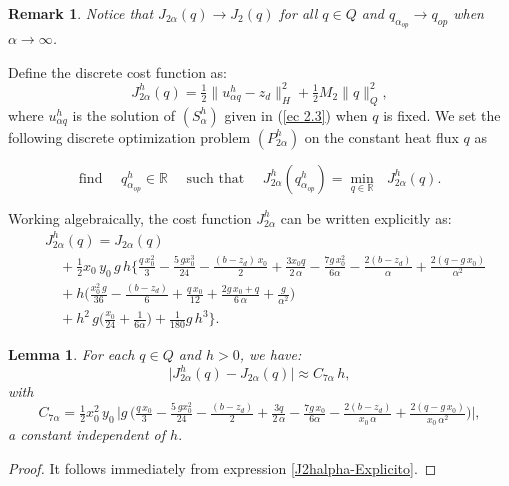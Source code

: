 \documentclass[11pt]{article}
\newtheorem{Lemma}{Lemma}
\newtheorem{Remark}{Remark}
\begin{document}
 \begin{Remark} Notice that $J_{2\alpha}(q)\to J_2(q) $ for all $q\in Q$ and $q_{\alpha_{op}}\to q_{op}$ when $\alpha \to \infty$. 
\end{Remark}   
   
     
  
    
       \noindent Define the discrete cost function as:
\begin{equation}    
   {  J^h_{2 \alpha}} (q)=  \tfrac{1}{2} \lVert {u^h_{\alpha q}} - z_d \rVert^2_H +  \tfrac{1}{2} M_2 \lVert q \rVert ^2_Q ,
     \end{equation}
where {$u^h_{\alpha q}$} is the solution of ${(S^h_{\alpha})}$ given in (\ref{ec 2.3}) {when $q$ is fixed}. We set the following discrete optimization problem 
 ${(P^h_{2\alpha})}$ on the constant heat flux $q$ as

$$ \text{find }\quad { q^h_{\alpha_{op}}}\in \mathbb{R}\quad\text{ such that }\quad
{ J^h_{2 \alpha}}({ q^h_{\alpha_{op}}})=\min\limits_{q\in \mathbb{R}} \text{ }{ J^h_{2 \alpha}}({q}).
$$
  
    
    
  
  
  Working algebraically, the cost function ${ J^h_{2 \alpha}}$ can be written explicitly as:
  \begin{equation}\label{J2halpha-Explicito}
  \begin{array}{rl}
&  { J^h_{2 \alpha}}(q)= J_{2\alpha}(q) \\[0.45cm]
  &\quad+ \tfrac{1}{2} x_0\,y_0 \,g \,h \Big \{   \tfrac{ q\,x_0^2}{3}   - \tfrac{5\,g x_0^3}{24}  - \tfrac{(b-z_d)\,x_0}{2} 
    + \tfrac{3 x_0 q}{2\,\alpha} - \tfrac{7 g\,x_0^2}{6\alpha}
     - \tfrac{2(b-z_d)}{\alpha}+ \tfrac{2(q-g\,x_0)}{\alpha^2} \\[0.45cm]
    & \quad + h \Big( \tfrac{x_0^2\, g}{36}-  \tfrac{(b-z_d)}{6} + \tfrac{q \,x_0}{12} + \tfrac{2g\,x_0+q}{6\,\alpha}+\tfrac{g}{\alpha^2}\Big)\\[0.45cm]
    & \quad + h^2\,g \Big( \tfrac{x_0}{24} + \tfrac{1}{6\alpha} \Big) + \tfrac{1}{180} g\, h^3 \Big\}. 
    \end{array}
    \end{equation}
     

  
\begin{Lemma}\label{Lema 4.4} For each $q\in Q$  and $h>0$, we have:
\begin{equation}   \lvert  { J^h_{2 \alpha}}(q) - J_{2\alpha}(q) \rvert  \approx C_{7 \alpha} \, h, 
   \end{equation}
      with $$C_{7 \alpha} = \tfrac{1}{2}x_0^2\, y_0\, \Big \lvert g \,  \Big(  \tfrac{ q\,x_0}{3}   - \tfrac{5\,g x_0^2}{24}  - \tfrac{(b-z_d)}{2}+ \tfrac{3 q}{2\,\alpha} - \tfrac{7 g\,x_0}{6\alpha} - \tfrac{2(b-z_d)}{x_0 \,\alpha}+ \tfrac{2(q-g\,x_0)}{x_0\,\alpha^2}\Big)    \Big \rvert, $$ a constant independent of $h.$      
  
\end{Lemma}
\begin{proof}
It follows immediately from expression \eqref{J2halpha-Explicito}.
\end{proof}
\end{document}
